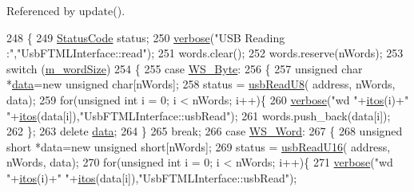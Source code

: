 Referenced by update().


\begin{DoxyCode}
248 \{
249   \hyperlink{classStatusCode}{StatusCode} status;
250   \hyperlink{classObject_a83d2db2df682907ea1115ad721c1c4a1}{verbose}(\textcolor{stringliteral}{"USB Reading :"},\textcolor{stringliteral}{"UsbFTMLInterface::read"});
251   words.clear();
252   words.reserve(nWords);
253   \textcolor{keywordflow}{switch} (\hyperlink{classUsbFTMLInterface_a39a8dfbe54cc29e033fa2a4d5fbbc982}{m\_wordSize})
254   \{
255   \textcolor{keywordflow}{case} \hyperlink{classUsbFTMLInterface_ae0f25daa336091a5acd548aef3e9b4b4a6d1f2c03dd60649290649efd7fb7f57d}{WS\_Byte}:
256     \{
257       \textcolor{keywordtype}{unsigned} \textcolor{keywordtype}{char} *\hyperlink{namespaceshell_a5ea2525995cedc3efd69ea8a7f034d1e}{data}=\textcolor{keyword}{new} \textcolor{keywordtype}{unsigned} \textcolor{keywordtype}{char}[nWords];
258       status = \hyperlink{classUsbFTMLInterface_ac356419a8bbaa26e63f182a86e5fd380}{usbReadU8}( address, nWords, data);
259       \textcolor{keywordflow}{for}(\textcolor{keywordtype}{unsigned} \textcolor{keywordtype}{int} i = 0; i < nWords; i++)\{
260         \hyperlink{classObject_a83d2db2df682907ea1115ad721c1c4a1}{verbose}(\textcolor{stringliteral}{"wd "}+\hyperlink{Tools_8h_af330027dbdafb9a30768b3613c553e60}{itos}(i)+\textcolor{stringliteral}{" "}+\hyperlink{Tools_8h_af330027dbdafb9a30768b3613c553e60}{itos}(data[i]),\textcolor{stringliteral}{"UsbFTMLInterface::usbRead"});
261         words.push\_back(data[i]);
262       \};
263       \textcolor{keyword}{delete} \hyperlink{namespaceshell_a5ea2525995cedc3efd69ea8a7f034d1e}{data};
264     \}
265     \textcolor{keywordflow}{break};
266   \textcolor{keywordflow}{case} \hyperlink{classUsbFTMLInterface_ae0f25daa336091a5acd548aef3e9b4b4adcfe42e171e84db403d40614f2502f3e}{WS\_Word}:
267     \{
268       \textcolor{keywordtype}{unsigned} \textcolor{keywordtype}{short} *data=\textcolor{keyword}{new} \textcolor{keywordtype}{unsigned} \textcolor{keywordtype}{short}[nWords];
269       status = \hyperlink{classUsbFTMLInterface_a5fb608bce418671265b61266033cedc0}{usbReadU16}( address, nWords, data);
270       \textcolor{keywordflow}{for}(\textcolor{keywordtype}{unsigned} \textcolor{keywordtype}{int} i = 0; i < nWords; i++)\{
271         \hyperlink{classObject_a83d2db2df682907ea1115ad721c1c4a1}{verbose}(\textcolor{stringliteral}{"wd "}+\hyperlink{Tools_8h_af330027dbdafb9a30768b3613c553e60}{itos}(i)+\textcolor{stringliteral}{" "}+\hyperlink{Tools_8h_af330027dbdafb9a30768b3613c553e60}{itos}(data[i]),\textcolor{stringliteral}{"UsbFTMLInterface::usbRead"});

\end{DoxyCode}
